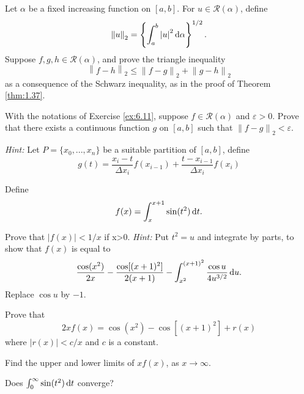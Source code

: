 \begin{myexercise}
    \label{ex:6.11}
    Let $\alpha$ be a fixed increasing function on $[a, b]$. 
    For $u \in \mathscr{R}(\alpha)$, define
    \begin{equation*}
        \left\| u \right\|_2 = \left\{ \int_a^b \left| u \right|^2 \d \alpha \right\}^{1/2} .
    \end{equation*}
    Suppose $f, g, h \in \mathscr{R}(\alpha)$, and prove the triangle inequality
    \begin{equation*}
        \left\| f-h \right\|_2 \leq
        \left\| f-g \right\|_2 +
        \left\| g-h \right\|_2 
    \end{equation*}
    as a consequence of the Schwarz inequality, as in the proof of Theorem \ref{thm:1.37}.
\end{myexercise}


\begin{myexercise}
    \label{ex:6.12}
    With the notations of Exercise \ref{ex:6.11}, 
    suppose $f \in \mathscr{R}(\alpha)$ and $\varepsilon > 0$. 
    Prove that there exists a continuous function $g$ on $[a, b]$ such that $\left\| f-g \right\|_2 < \varepsilon$.

    \emph{Hint:} Let $P = \{x_0,...,x_n\}$ be a suitable partition of $[a, b]$, define
    \begin{equation*}
        g(t) = 
        \frac{x_i-t}{\Delta x_i} f(x_{i-1}) +
        \frac{t-x_{i-1}}{\Delta x_i} f(x_{i})
    \end{equation*}
\end{myexercise}


\begin{myexercise}
    \label{ex:6.13}
    Define 
    \begin{equation*}
        f(x) = \int_{x}^{x+1} \sin (t^2) \d t.
    \end{equation*}
    \begin{asparaenum}[(a)]
        \item Prove that $\left| f(x) \right| < 1/x$ if x>0.
        \emph{Hint:} Put $t^2 = u$ and integrate by parts, to show that $f(x)$ is equal to 
        \begin{equation*}
            \frac{\cos(x^2)}{2x} - \frac{\cos [(x+1)^2]}{2(x+1)} - \int_{x^2}^{(x+1)^2}\frac{\cos u}{4 u^{3/2}} \d u.
        \end{equation*}
        Replace $\cos u$ by $-1$.
        \item Prove that 
        \begin{equation*}
            2xf(x) = \cos(x^2) - \cos [(x+1)^2] + r(x)
        \end{equation*}
        where $\left| r(x) \right| < c/x$ and $c$ is a constant.
        \item Find the upper and lower limits of $x f(x)$, as $x \rightarrow \infty$.
        \item Does $\int_{0}^{\infty} \sin (t^2) \d t$ converge?
    \end{asparaenum}
\end{myexercise}


